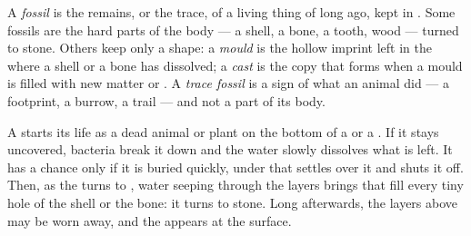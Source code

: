 \begin{definition}[Fossil]\label{def:g7:sediments-and-fossils:fossil}
A \emph{fossil} is the remains, or the trace, of a living
thing of long ago, kept in . Some fossils are the hard parts of the
body --- a shell, a bone, a tooth, wood --- turned to stone. Others keep
only a shape: a \emph{mould} is the hollow imprint left in
the  where a shell or a bone has dissolved; a \emph{cast}
is the copy that forms when a mould is filled with new  matter or
. A \emph{trace fossil} is a sign of what an
animal did --- a footprint, a burrow, a trail --- and not a part of its
body.
\end{definition}

A  starts its life as a dead animal or plant on the bottom of a
 or a . If it stays uncovered, bacteria break it down and the
water slowly dissolves what is left. It has a chance only if it is
buried quickly, under  that settles over it and shuts it off.
Then, as the  turns to , water seeping through the layers
brings  that fill every tiny hole of the shell or the bone: it
turns to stone. Long afterwards, the layers above may be worn away, and
the  appears at the surface.

